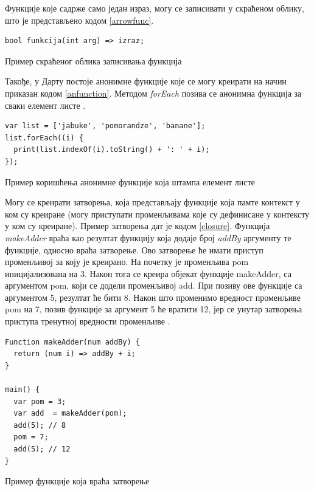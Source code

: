 \documentclass[12pt,oneside]{memoir}
\begin{document}
Функције које садрже само један израз, могу се записивати у скраћеном облику, што је представљено кодом \ref{arrowfunc}. 
\begin{listing}
\begin{verbatim}
bool funkcija(int arg) => izraz;
\end{verbatim}
\caption{Пример скраћеног облика записивања функција}
\label{arrowfunc}
\end{listing}

Такође, у Дарту постоје анонимне функције које се могу креирати на начин приказан кодом \ref{anfunction}. Методом \textit{forEach} позива се анонимна функција за сваки елемент листе \cite{dart, dart1}.

\begin{listing}
\begin{verbatim}
var list = ['jabuke', 'pomorandze', 'banane'];
list.forEach((i) {
  print(list.indexOf(i).toString() + ': ' + i);
});
\end{verbatim}
\caption{Пример коришћења анонимне функције која штампа елемент листе}
\label{anfunction}
\end{listing}

Могу се креирати затворења, која представљају функције која памте контекст у ком су креиране (могу приступати променљивама које су дефинисане у контексту у ком су креиране). Пример затворења дат је кодом \ref{closure}. Функција \textit{makeAdder} враћа као резултат функцију која додаје број \textit{addBy} аргументу те функције, односно враћа затворење.  Ово затворење ће имати приступ променљивој за коју је креирано. На почетку је променљива pom иницијализована на 3. Након тога се креира објекат функције makeAdder, са аргументом pom, који се додели променљивој add. При позиву ове функције са аргументом 5, резултат ће бити 8. Након што променимо вредност променљиве pom на 7, позив функције за аргумент 5 ће вратити 12, јер се унутар затворења приступа тренутној вредности променљиве \cite{dart, dart1}.

\begin{listing}
\begin{verbatim}
Function makeAdder(num addBy) {
  return (num i) => addBy + i;
}

main() {
  var pom = 3;
  var add  = makeAdder(pom);
  add(5); // 8
  pom = 7;
  add(5); // 12
}
\end{verbatim}
\caption{Пример функције која враћа затворење}
\label{closure}
\end{listing}
\end{document}
